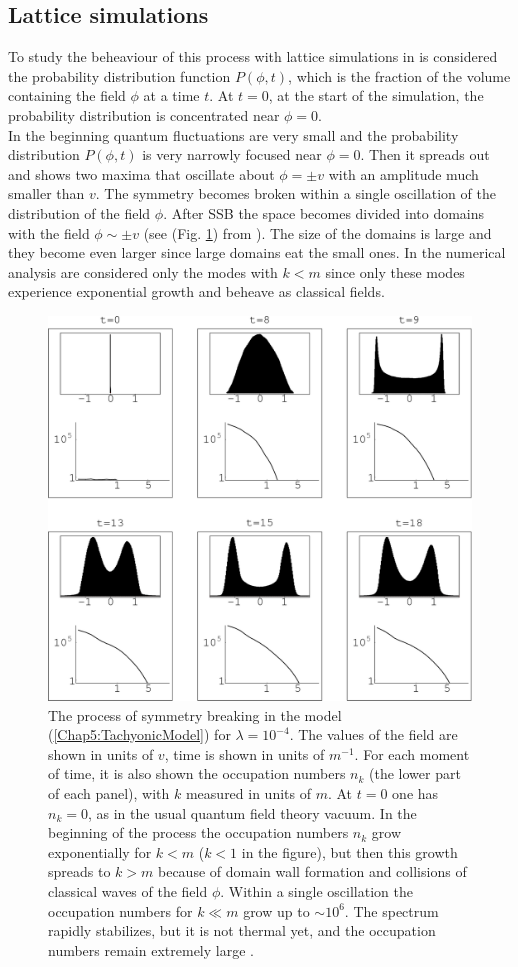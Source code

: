 \documentclass[11pt,a4paper,twoside]{book}
\begin{document}
\subsection{Lattice simulations}
To study the beheaviour of this process with lattice simulations in \cite{Chap5:TachyonicInstability} is considered the probability distribution function $ P(\phi,t) $, which is the fraction of the volume containing the field $\phi$ at a time $ t $. At $ t=0 $, at the start of the simulation, the probability distribution is concentrated near $\phi=0$.\\
In the beginning quantum fluctuations are very small and the probability distribution $ P(\phi,t) $ is very narrowly focused near $\phi=0$. Then it spreads out and shows two maxima that oscillate about $\phi = \pm v$ with an amplitude much smaller than $ v $. The symmetry becomes broken within a single oscillation of the distribution of the field $\phi$. After SSB the space becomes divided into domains with the field $\phi \sim \pm v$ (see (Fig. \ref{fig:tachyonicinstabilityfig3}) from \cite{Chap5:TachyonicInstability}). The size of the domains is large and they become even larger since large domains eat the small ones. In the numerical analysis  are considered only the modes with $ k < m $ since only these modes experience exponential growth and beheave as classical fields.\\
\begin{figure}[h]
	\centering
	\includegraphics[width=0.7\linewidth, height=0.35\textheight]{Images/Chap5/TachyonicInstability_Fig3}
	\caption{The process of symmetry breaking in the model (\ref{Chap5:TachyonicModel}) for $\lambda = 10^{-4}$. The values of the field are shown in units of $ v $, time is shown in units of $ m^{-1} $. For each moment of time, it is also shown the occupation numbers $ n_{k} $ (the lower part of each panel), with $ k $ measured in units of $ m $. At $ t=0 $ one has $ n_{k}=0 $, as in the usual quantum field theory vacuum. In the beginning of the process the occupation numbers $ n_{k} $ grow exponentially for $ k < m $ ($ k < 1 $ in the figure), but then this growth spreads to $ k>m $ because of domain wall formation and collisions of classical waves of the field $\phi$. Within a single oscillation the occupation numbers for $ k\ll m $ grow up to $\sim 10^{6}$.  The spectrum rapidly stabilizes, but it is not thermal yet, and the occupation numbers remain extremely large \cite{Chap5:TachyonicInstability}.}
	\label{fig:tachyonicinstabilityfig3}
\end{figure}
\end{document}
